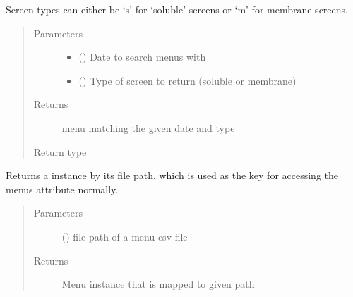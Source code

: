\documentclass[letterpaper,10pt,english]{sphinxmanual}
\begin{document}
\begin{fulllineitems}
\begin{fulllineitems}
Screen types can either be ‘s’ for ‘soluble’ screens or ‘m’ for
membrane screens.
\begin{quote}\begin{description}
\item[{Parameters}] \leavevmode\begin{itemize}
\item {} 
 () \textendash{} Date to search menus with

\item {} 
 () \textendash{} Type of screen to return (soluble or membrane)

\end{itemize}

\item[{Returns}] \leavevmode
menu matching the given date and type

\item[{Return type}] \leavevmode
{\hyperref[\detokenize{polo.utils:polo.utils.io_utils.Menu}]{}}

\end{description}\end{quote}

\end{fulllineitems}


\begin{fulllineitems}
\label{\detokenize{polo.utils:polo.utils.io_utils.BarTender.get_menu_by_path}}
Returns a {\hyperref[\detokenize{polo.utils:polo.utils.io_utils.Menu}]{}} instance by its file path, which is
used as the key for accessing the menus attribute normally.
\begin{quote}\begin{description}
\item[{Parameters}] \leavevmode
{} () \textendash{} file path of a menu csv file

\item[{Returns}] \leavevmode
Menu instance that is mapped to given path


\end{description}
\end{quote}
\end{fulllineitems}
\end{fulllineitems}
\end{document}
